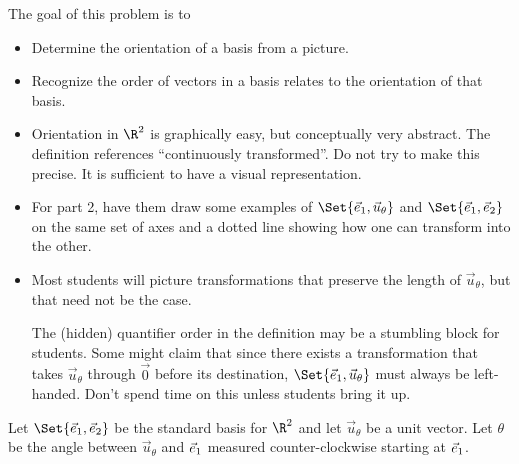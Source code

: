 	\question
	\begin{annotation}
		\begin{goals}

			The goal of this problem is to
			\begin{itemize}
				\item Determine the orientation of a basis from a  picture.
				\item Recognize the order of vectors in a basis relates to the
					orientation of that basis.
			\end{itemize}
		\end{goals}

		\begin{notes}
			\begin{itemize}
				\item Orientation in $\R^2$ is graphically easy, but conceptually very abstract.
					The definition references ``continuously transformed''. Do not try
					to make this precise. It is sufficient to have a visual representation.
				\item For part 2, have them draw some examples of $\Set{\xhat, \vec u_\theta}$
					and $\Set{\xhat, \yhat}$ on the same set of axes and a dotted line
					showing how one can transform into the other.
				\item Most students will picture transformations that preserve the length of $\vec u_\theta$,
					but that need not be the case.

					The (hidden) quantifier order in the definition may be a stumbling block for students. Some might
					claim that since there exists a transformation that takes $\vec u_\theta$ through $\vec 0$
					before its destination, $\Set{\xhat,\vec u_\theta}$ must always be left-handed.
					Don't spend time on this unless students bring it up.
			\end{itemize}
		\end{notes}
	\end{annotation}
	Let $\Set{\xhat,\yhat}$ be the standard basis for $\R^2$ and let
	$\vec u_{\theta}$ be a unit vector. Let $\theta$ be the angle between $\vec u_{\theta}$ and
	${\vec e_1}$ measured counter-clockwise starting at ${\vec e_1}$.

